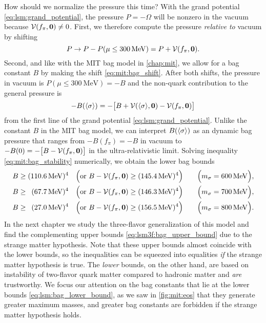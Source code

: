 How should we normalize the pressure this time?
With the grand potential \eqref{eq:lsm:grand_potential},
the pressure $P = - \Omega$ will be nonzero in the vacuum because $\mathcal{V}(f_\pi,{\bm{0}}) \neq 0$.
First, we therefore compute the pressure \emph{relative to} vacuum by shifting
\begin{equation}
	P \rightarrow P - P(\mu \leq \SI{300}{\mega\electronvolt}) = P + \mathcal{V}(f_\pi,{\bm{0}}) .
\label{eq:lsm:pressure_bagless}
\end{equation}
Second, and like with the MIT bag model in \cref{chap:mit},
we allow for a bag constant $B$ by making the shift \eqref{eq:mit:bag_shift}.
After both shifts,
the pressure in vacuum is $P(\mu \leq \SI{300}{\mega\electronvolt}) = -B$
and the non-quark contribution to the general pressure is
\begin{equation}
	-B(\langle \sigma \rangle) = -\big[B+\mathcal{V}(\langle \sigma \rangle,{\bm{0}})-\mathcal{V}(f_\pi,{\bm{0}})\big]
\label{eq:lsm:bag_pressure}
\end{equation}
from the first line of the grand potential \eqref{eq:lsm:grand_potential}.
Unlike the constant $B$ in the MIT bag model,
we can interpret $B(\langle \sigma \rangle)$ as an dynamic bag pressure that ranges from $-B(f_\pi)=-B$ in vacuum to $-B(0) = -\big[B-\mathcal{V}(f_\pi,{\bm{0}})\big]$ in the ultra-relativistic limit.
Solving inequality \eqref{eq:mit:bag_stability} numerically, we obtain the lower bag bounds
\begin{subequations}
\begin{align}
	B \geq (\SI{110.6}{\mega\electronvolt})^4           \quad \Big(\text{or } B-\mathcal{V}(f_\pi,{\bm{0}}) \geq (\SI{145.4}{\mega\electronvolt})^4\Big) \qquad \Big(m_\sigma = \SI{600}{\mega\electronvolt}\Big), \label{eq:lsm:bag_lower_bound_600} \\
	B \geq \phantom{0}(\SI{67.7}{\mega\electronvolt})^4 \quad \Big(\text{or } B-\mathcal{V}(f_\pi,{\bm{0}}) \geq (\SI{146.3}{\mega\electronvolt})^4\Big) \qquad \Big(m_\sigma = \SI{700}{\mega\electronvolt}\Big), \label{eq:lsm:bag_lower_bound_700} \\
	B \geq \phantom{0}(\SI{27.0}{\mega\electronvolt})^4 \quad \Big(\text{or } B-\mathcal{V}(f_\pi,{\bm{0}}) \geq (\SI{156.5}{\mega\electronvolt})^4\Big) \qquad \Big(m_\sigma = \SI{800}{\mega\electronvolt}\Big). \label{eq:lsm:bag_lower_bound_800}
\end{align}%
\label{eq:lsm:bag_lower_bound}%
\end{subequations}%
In the next chapter we study the three-flavor generalization of this model
and find the complementing upper bounds \eqref{eq:lsm3f:bag_upper_bound}
due to the strange matter hypothesis.
Note that these upper bounds almost coincide with the lower bounds,
so the inequalities can be squeezed into equalities \emph{if} the strange matter hypothesis is true.
The \emph{lower} bounds, on the other hand, are based on instability of two-flavor quark matter compared to hadronic matter and \emph{are} trustworthy.
We focus our attention on the bag constants that lie at the lower bounds \eqref{eq:lsm:bag_lower_bound},
as we saw in \cref{fig:mit:eos} that they generate greater maximum masses,
and greater bag constants are forbidden if the strange matter hypothesis holds.


